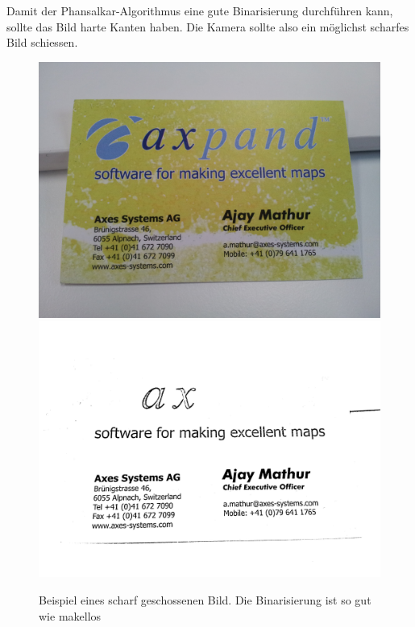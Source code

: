 \documentclass[10pt]{article}
\begin{document}
Damit der Phansalkar-Algorithmus eine gute Binarisierung durchführen kann, sollte das Bild harte Kanten haben. Die Kamera sollte also ein möglichst scharfes Bild schiessen.
\begin{figure}[h!]
	\centering
	\includegraphics[scale= 0.06]{AMathur.jpg}
	\includegraphics[scale= 0.06]{AMathurPhansalkar.png}
\caption{Beispiel eines scharf geschossenen Bild. Die Binarisierung ist so gut wie makellos}
\end{figure}
\end{document}
